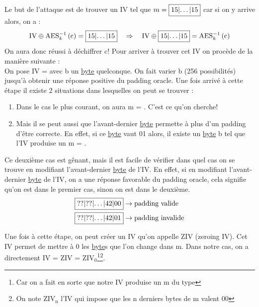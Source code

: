 \documentclass[a4paper, 12pt]{article}
\begin{document}
\label{demodinpaddingracle}Le but de l'attaque est de trouver un IV tel que $m = \fbox{15|\dots|15}$ car si on y arrive alors, on a : 
$$ 
\text{IV} \oplus \text{AES}^{-1}_{k}\left(\text{c}\right) = \fbox{15|\dots|15} \quad \Rightarrow \quad \text{IV} \oplus \fbox{15|\dots|15} = \text{AES}^{-1}_{k}\left(\text{c}\right)
$$
On aura donc réussi à déchiffrer c! Pour arriver à trouver cet IV on procède de la manière suivante : \\

On pose IV =  avec b un \hyperref[byte]{byte} quelconque. On fait varier b (256 possibilités) jusqu'à obtenir une réponse positive du padding oracle. Une fois arrivé à cette étape il existe 2 situations dans lesquelles on peut se trouver :

\begin{enumerate}
	\item Dans le cas le plus courant, on aura m = . C'est ce qu'on cherche!
	\item Mais il se peut aussi que l'avant-dernier \hyperref[byte]{byte} permette à plus d'un padding d'être correcte. En effet, si ce \hyperref[byte]{byte} vaut 01 alors, il existe un \hyperref[byte]{byte} b tel que l'IV produise un m = .
\end{enumerate}
Ce deuxième cas est gênant, mais il est facile de vérifier dans quel cas on se trouve en modifiant l'avant-dernier \hyperref[byte]{byte} de l'IV.
En effet, si en modifiant l'avant-dernier \hyperref[byte]{byte} de l'IV, on a une réponse favorable du padding oracle, cela signifie qu'on est dans le premier cas, sinon on est dans le deuxième. 
\begin{align*}
	&\fbox{??|??|$\dots$|42|00} \rightarrow \text{padding valide}\\
	&\fbox{??|??|$\dots$|42|01} \rightarrow \text{padding invalide}
\end{align*}

Une fois à cette étape, on peut créer un IV qu'on appelle ZIV (zeroing IV). Cet IV permet de mettre à 0 les \hyperref[byte]{byte}s que l'on change dans m. Dans notre cas, on a directement IV = ZIV = $\text{ZIV}_{0}$\footnote{Car on a fait en sorte que notre IV produise un m du type }\footnote{On note $\text{ZIV}_{\text{n}}$ l'IV qui impose que les n derniers bytes de m valent 00}. \\
\end{document}
